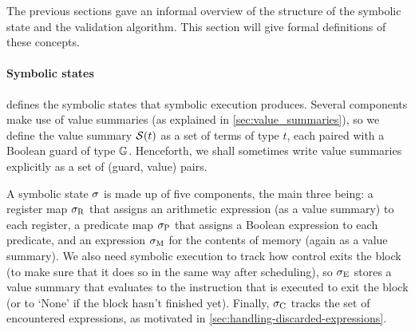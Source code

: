 {The previous sections gave an informal overview of the structure of the symbolic
state and the validation algorithm.  This section will give formal definitions
of these concepts.

\paragraph{Symbolic states}
 defines the symbolic states that symbolic
execution produces. Several components make use of value summaries (as explained
in \cref{sec:value_summaries}), so we define the value summary $\mathcal{S}(t)$
as a set of terms of type $t$, each paired with a Boolean guard of type
$\mathbb{G}$. Henceforth, we shall sometimes write value summaries explicitly as
a set of (guard, value) pairs.

A symbolic state $\sigma$ is made up of five components, the main three
being: a register map $\sigma_{\mathrm{R}}$ that assigns an arithmetic
expression (as a value summary) to each register, a predicate map
$\sigma_{\mathrm{P}}$ that assigns a Boolean expression to each
predicate, and an expression $\sigma_{\mathrm{M}}$ for the contents of memory
(again as a value summary).  We also need symbolic execution to track how
control exits the block (to make sure that it does so in the same way after
scheduling), so $\sigma_{\mathrm{E}}$ stores a value summary that evaluates
to the instruction that is executed to exit the block (or to `None' if the block
hasn't finished yet). Finally, $\sigma_{\mathrm{C}}$ tracks the set of
encountered expressions, as motivated in
\cref{sec:handling-discarded-expressions}.



}
